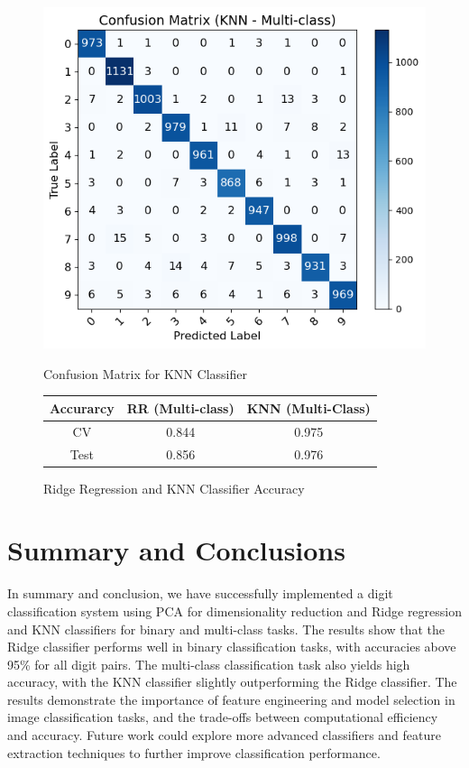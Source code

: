 \documentclass[11pt]{amsart}
\begin{document}
\begin{figure}[htbp]
    \centering
    \begin{minipage}[b]{0.45\textwidth}
        \centering
        \includegraphics[width=\textwidth]{ConfusionKNN.png}  %
        \caption{Confusion Matrix for KNN Classifier}
        \label{fig:KNN_Confusion}
    \end{minipage}
    \hfill
    \begin{minipage}[b]{0.45\textwidth}
        \centering
        \begin{tabular}{c|c|c}
            \hline
            Accurarcy & RR (Multi-class) & KNN (Multi-Class) \\
            \hline
            CV & 0.844 & 0.975 \\
            Test & 0.856 & 0.976 \\
            \hline
        \end{tabular}
        \caption{Ridge Regression and KNN Classifier Accuracy}
        \label{tab:mytable}
    \end{minipage}
\end{figure}



\section*{Summary and Conclusions}

In summary and conclusion, we have successfully implemented a digit classification system using PCA for dimensionality reduction and Ridge regression and KNN classifiers for binary and multi-class tasks. The results show that the Ridge classifier performs well in binary classification tasks, with accuracies above 95\% for all digit pairs. The multi-class classification task also yields high accuracy, with the KNN classifier slightly outperforming the Ridge classifier. The results demonstrate the importance of feature engineering and model selection in image classification tasks, and the trade-offs between computational efficiency and accuracy. Future work could explore more advanced classifiers and feature extraction techniques to further improve classification performance.
\end{document}
